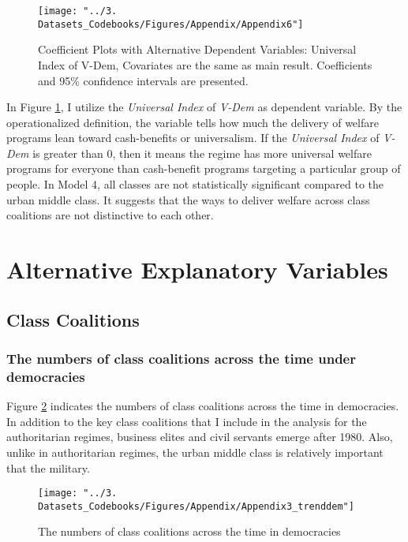 \documentclass[12pt]{article}
\begin{document}
	\begin{figure}[!ht]
		\centering
		\texttt{[image: "../3. Datasets\_Codebooks/Figures/Appendix/Appendix6"]}
		\caption{Coefficient Plots with Alternative Dependent Variables:
			Universal Index of V-Dem, Covariates are the same as main result.
			Coefficients and 95\% confidence intervals are presented.}
		\label{fig:figure10}
	\end{figure}
	
	In Figure \ref{fig:figure10}, I utilize the \textit{Universal Index} of \textit{V-Dem} as dependent variable. By the operationalized definition, the variable tells how much the delivery of welfare programs lean toward cash-benefits or universalism. If the \textit{Universal Index} of \textit{V-Dem} is greater than 0, then it means the regime has more universal welfare programs for everyone than cash-benefit programs targeting a particular group of people. In Model 4, all classes are not statistically significant compared to the urban middle class. It suggests that the ways to deliver welfare across class coalitions are not distinctive to each other.
	
	\section{Alternative Explanatory Variables}
	\subsection{Class Coalitions}
	\subsubsection{The numbers of class coalitions across the time under democracies}
	Figure \ref{fig:figure7} indicates the numbers of class coalitions across the time in democracies. In addition to the key class coalitions that I include in the analysis for the authoritarian regimes, business elites and civil servants emerge after 1980. Also, unlike in authoritarian regimes, the urban middle class is relatively important that the military.
	
	\begin{figure}[!ht]
		\centering
		\texttt{[image: "../3. Datasets\_Codebooks/Figures/Appendix/Appendix3\_trenddem"]}
		\caption{The numbers of class coalitions across the time in democracies}
		\label{fig:figure7}
	\end{figure}
	
\end{document}
